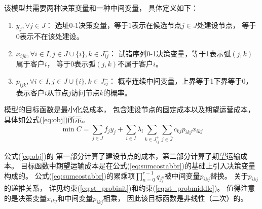 该模型共需要两种决策变量和一种中间变量，
具体定义如下：
\begin{enumerate}[label=(\arabic*),leftmargin=0pt,itemindent=3.5\ccwd, nosep]
\item $y_j,\forall j \in J$：
选址0-1决策变量，等于1表示在候选节点$j\in J$处建设节点，
等于0表示不在该处建设。

\item $x_{ijk},\forall i \in I, j \in J\cup \{i\}, k\in J_{ij}^-$：
试错序列0-1决策变量，等于1表示弧$(j,k)$属于客户$i$，
等于0表示弧$(j,k)$不属于客户$i$。

\item $p_{ijk},\forall i \in I, j \in J\cup \{i\}, k\in J_{ij}^-$：
概率连续中间变量，上界等于1下界等于0，
表示客户$i$从节点$j$访问节点$k$的概率。
\end{enumerate}

模型的目标函数是最小化总成本，
包含建设节点的固定成本以及期望运营成本，
具体如公式(\ref{eq:obj})所示。
\begin{equation}
\label{eq:obj}
\min C = \sum_{j\in J}f_jy_j
+ \sum_{i\in I}\lambda_i 
\sum_{k\in J_{ij}^+}\sum_{j\in \bar{J}}
c_{kj} p_{ikj} x_{ikj}
\end{equation}

公式(\ref{eq:obj})的
第一部分计算了建设节点的成本，第二部分计算了期望运输成本。
目标函数中期望运输成本是在公式(\ref{eq:sumcostabbr})的基础上引入决策变量构成的。
公式(\ref{eq:sumcostabbr})的累乘项$\prod_{n=0}^{r-1} q_{j_i^n}$被中间变量$p_{ikj}$替换。
关于$p_{ikj}$的递推关系，
详见约束(\ref{eq:st_probinit})和约束(\ref{eq:st_probmiddle})。
值得注意的是决策变量$x_{ikj}$和中间变量$p_{ikj}$相乘，
因此该目标函数是非线性（二次）的。


